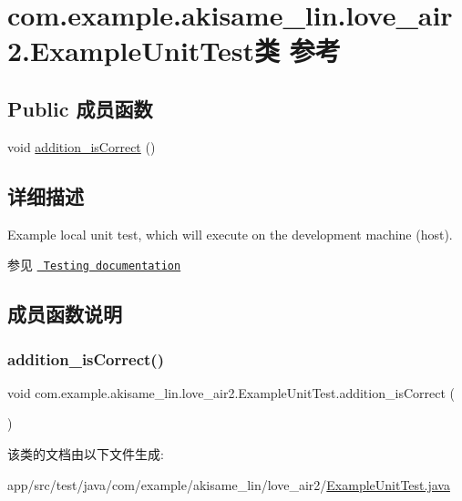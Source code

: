 \hypertarget{classcom_1_1example_1_1akisame__lin_1_1love__air2_1_1_example_unit_test}{}\section{com.\+example.\+akisame\+\_\+lin.\+love\+\_\+air2.\+Example\+Unit\+Test类 参考}
\label{classcom_1_1example_1_1akisame__lin_1_1love__air2_1_1_example_unit_test}
\subsection*{Public 成员函数}
\begin{DoxyCompactItemize}
\item 
void \mbox{\hyperlink{classcom_1_1example_1_1akisame__lin_1_1love__air2_1_1_example_unit_test_ac9db2d0670d0f92c272e878548da71d9}{addition\+\_\+is\+Correct}} ()
\end{DoxyCompactItemize}


\subsection{详细描述}
Example local unit test, which will execute on the development machine (host).

\begin{DoxySeeAlso}{参见}
\href{http://d.android.com/tools/testing}{\texttt{ Testing documentation}} 
\end{DoxySeeAlso}


\subsection{成员函数说明}
\mbox{\label{classcom_1_1example_1_1akisame__lin_1_1love__air2_1_1_example_unit_test_ac9db2d0670d0f92c272e878548da71d9}} 
\subsubsection{\texorpdfstring{addition\_isCorrect()}{addition\_isCorrect()}}
{\footnotesize\ttfamily void com.\+example.\+akisame\+\_\+lin.\+love\+\_\+air2.\+Example\+Unit\+Test.\+addition\+\_\+is\+Correct (\begin{DoxyParamCaption}{ }\end{DoxyParamCaption})\hspace{0.3cm}{\ttfamily [inline]}}



该类的文档由以下文件生成\+:\begin{DoxyCompactItemize}
\item 
app/src/test/java/com/example/akisame\+\_\+lin/love\+\_\+air2/\mbox{\hyperlink{_example_unit_test_8java}{Example\+Unit\+Test.\+java}}\end{DoxyCompactItemize}
